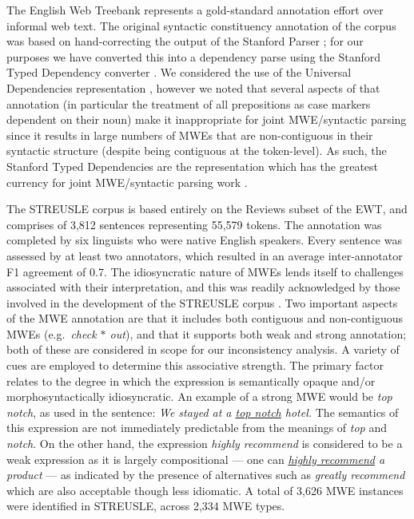 \documentclass[output=paper
,modfonts
,nonflat]{langsci/langscibook}
\newcommand{\lex}[1]{\textit{#1}\xspace}
\newcommand{\gap}{$*$\xspace}
\begin{document}
The English Web Treebank \citep{EWT} represents a gold-standard annotation effort over informal web text. The original syntactic constituency annotation of the corpus was based on hand-correcting the output of the Stanford Parser \citep{Manning+:2014}; for our purposes we have converted this into a dependency parse using the Stanford Typed Dependency converter \citep{StanfordDep}. We considered the use of the Universal Dependencies representation \citep{nivre2016universal}, however we noted that several aspects of that annotation (in particular the treatment of all prepositions as case markers dependent on their noun) make it inappropriate for joint MWE/syntactic parsing since it results in large numbers of MWEs that are non-contiguous in their syntactic structure (despite being contiguous at the token-level). As such, the Stanford Typed Dependencies are the representation which has the greatest currency for joint MWE/syntactic parsing work \citep{Constant16}. 

The STREUSLE corpus \citep{Schneider14} is based entirely on the Reviews subset of the EWT, and comprises of 3,812 sentences representing 55,579 tokens. The annotation was completed by six linguists who were native English speakers. Every sentence was assessed by at least two annotators, which resulted in an average inter-annotator F1 agreement of 0.7. The idiosyncratic nature of MWEs lends itself to challenges associated with their interpretation, and this was readily acknowledged by those involved in the development of the STREUSLE corpus \citep{Hollenstein16}. Two important aspects of the MWE annotation are that it includes both contiguous and non-contiguous MWEs (e.g.\ \lex{check \gap out}), and that it supports both weak and strong annotation; both of these are considered in scope for our inconsistency analysis. A variety of cues are employed to determine this associative strength. The primary factor relates to the degree in which the expression is semantically opaque and/or morphosyntactically idiosyncratic. An example of a strong MWE would be \lex{top notch}, as used in the sentence: \lex{We stayed at a \underline{top notch} hotel.} The semantics of this expression are not immediately predictable from the meanings of \lex{top} and \lex{notch}. On the other hand, the expression \lex{highly recommend} is considered to be a weak expression as it is largely compositional --- one can \lex{\underline{highly recommend} a product} --- as indicated by the presence of alternatives such as \lex{greatly recommend} which are also acceptable though less idiomatic. A total of 3,626 MWE instances were identified in STREUSLE, across 2,334 MWE types.
\end{document}

